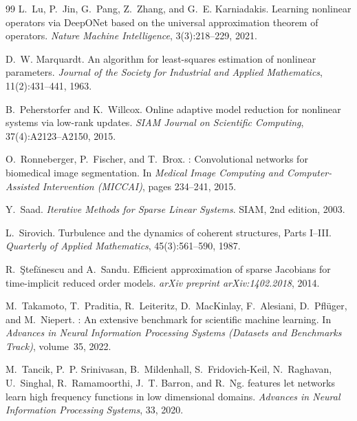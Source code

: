 \begin{thebibliography}{99}
L.~Lu, P.~Jin, G.~Pang, Z.~Zhang, and G.~E. Karniadakis.
\newblock Learning nonlinear operators via DeepONet based on the
universal approximation theorem of operators.
\newblock \emph{Nature Machine Intelligence}, 3(3):218--229, 2021.

D.~W. Marquardt.
\newblock An algorithm for least-squares estimation of nonlinear parameters.
\newblock \emph{Journal of the Society for Industrial and Applied Mathematics},
11(2):431--441, 1963.

B.~Peherstorfer and K.~Willcox.
\newblock Online adaptive model reduction for nonlinear systems via low-rank
updates.
\newblock \emph{SIAM Journal on Scientific Computing}, 37(4):A2123--A2150, 2015.

O.~Ronneberger, P.~Fischer, and T.~Brox.
: Convolutional networks for biomedical image segmentation.
\newblock In \emph{Medical Image Computing and Computer-Assisted Intervention
(MICCAI)}, pages 234--241, 2015.

Y.~Saad.
\newblock \emph{Iterative Methods for Sparse Linear Systems}.
\newblock SIAM, 2nd edition, 2003.

L.~Sirovich.
\newblock Turbulence and the dynamics of coherent structures, Parts
I--III.
\newblock \emph{Quarterly of Applied Mathematics}, 45(3):561--590, 1987.

R.~{\c S}tef{\u a}nescu and A.~Sandu.
\newblock Efficient approximation of sparse {Jacobians} for time-implicit
reduced order models.
\newblock \emph{arXiv preprint arXiv:1402.2018}, 2014.

M.~Takamoto, T.~Praditia, R.~Leiteritz, D.~MacKinlay, F.~Alesiani,
D.~Pfl{\"u}ger, and M.~Niepert.
: An extensive benchmark for scientific machine learning.
\newblock In \emph{Advances in Neural Information Processing Systems (Datasets
and Benchmarks Track)}, volume~35, 2022.

M.~Tancik, P.~P. Srinivasan, B.~Mildenhall, S.~Fridovich-Keil, N.~Raghavan,
U.~Singhal, R.~Ramamoorthi, J.~T. Barron, and R.~Ng.
 features let networks learn high frequency functions in low
dimensional domains.
\newblock \emph{Advances in Neural Information Processing Systems}, 33, 2020.


\end{thebibliography}

